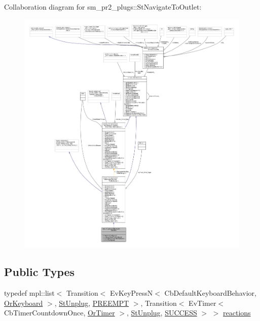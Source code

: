 Collaboration diagram for sm\+\_\+pr2\+\_\+plugs\+:\+:St\+Navigate\+To\+Outlet\+:
\nopagebreak
\begin{figure}[H]
\begin{center}
\leavevmode
\includegraphics[width=350pt]{structsm__pr2__plugs_1_1StNavigateToOutlet__coll__graph}
\end{center}
\end{figure}
\subsection*{Public Types}
\begin{DoxyCompactItemize}
\item 
typedef mpl\+::list$<$ Transition$<$ Ev\+Key\+PressN$<$ Cb\+Default\+Keyboard\+Behavior, \hyperlink{classsm__pr2__plugs_1_1OrKeyboard}{Or\+Keyboard} $>$, \hyperlink{structsm__pr2__plugs_1_1StUnplug}{St\+Unplug}, \hyperlink{classPREEMPT}{P\+R\+E\+E\+M\+PT} $>$, Transition$<$ Ev\+Timer$<$ Cb\+Timer\+Countdown\+Once, \hyperlink{classsm__pr2__plugs_1_1OrTimer}{Or\+Timer} $>$, \hyperlink{structsm__pr2__plugs_1_1StUnplug}{St\+Unplug}, \hyperlink{classSUCCESS}{S\+U\+C\+C\+E\+SS} $>$ $>$ \hyperlink{structsm__pr2__plugs_1_1StNavigateToOutlet_ab229b60e5144a98cdfd92c0928de573f}{reactions}
\end{DoxyCompactItemize}
